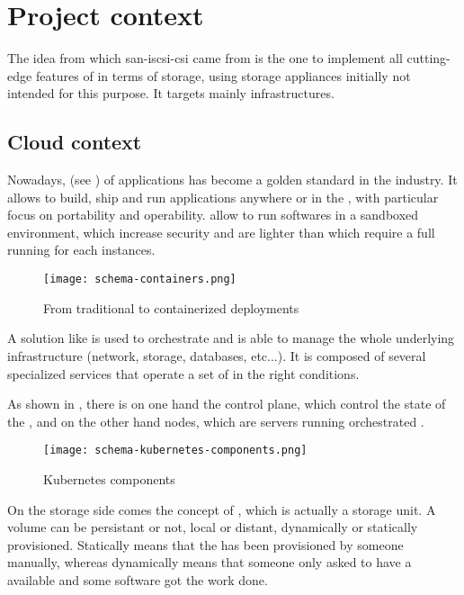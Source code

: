 \section{Project context}

The idea from which \gls{san-iscsi-csi} came from is the one to implement all cutting-edge features of  in terms of storage, using storage appliances initially not intended for this purpose. It targets mainly   infrastructures.

\subsection{Cloud context}

Nowadays,  (see ) of applications has become a golden standard in the industry. It allows to build, ship and run applications anywhere  or in the , with particular focus on portability and operability.  allow to run softwares in a sandboxed environment, which increase security and are lighter than  which require a full  running for each instances.

\begin{figure}[h]
    \centering
    \texttt{[image: schema-containers.png]}
    \caption{From traditional to containerized deployments}
    \label{fig:containers}
\end{figure}

A solution like  is used to orchestrate  and is able to manage the whole underlying infrastructure (network, storage, databases, etc...). It is composed of several specialized services that operate a set of  in the right conditions.

As shown in , there is on one hand the control plane, which control the state of the , and on the other hand  nodes, which are servers running orchestrated .

\begin{figure}[h]
    \centering
    \texttt{[image: schema-kubernetes-components.png]}
    \caption{Kubernetes components}
    \label{fig:k8s-components}
\end{figure}

On the storage side comes the concept of , which is actually a storage unit. A volume can be persistant or not, local or distant, dynamically or statically provisioned. Statically means that the  has been provisioned by someone manually, whereas dynamically means that someone only asked to have a  available and some software got the work done.

